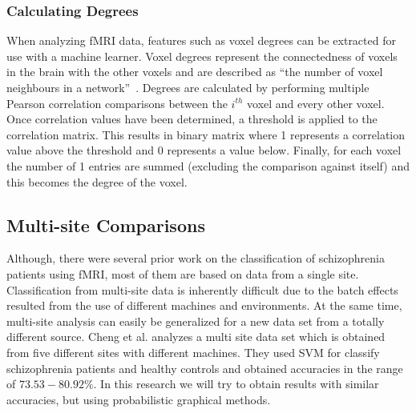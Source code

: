 \documentclass{article} %
\begin{document}
\subsubsection{Calculating Degrees}
When analyzing fMRI data, features such as voxel degrees can be extracted for
use with a machine learner. Voxel degrees represent the connectedness of
voxels in the brain with the other voxels and are described as ``the number
of voxel neighbours in a network''~\cite{Rish_2013}. Degrees are calculated 
by performing
multiple Pearson correlation comparisons between the $i^{th}$ voxel and every
other voxel. Once correlation values have been determined, a threshold is
applied to the correlation matrix. This results in binary matrix where 1 
represents a correlation value above the threshold and 0 represents a value 
below. Finally, for each voxel the number of 1 entries are summed (excluding 
the comparison against itself) and this becomes the degree of the voxel.


\subsection{Multi-site Comparisons}
Although, there were several prior work on the classification of schizophrenia 
patients using fMRI, most of them are based on data from a single site. 
Classification from multi-site data is inherently difficult due to the batch 
effects resulted from the use of different machines and environments. At the 
same time, multi-site analysis can easily be generalized for a new data set 
from a totally different source. Cheng et al. \cite{Cheng2015} analyzes a 
multi site data set which is obtained from five different sites with different 
machines. They used SVM for classify schizophrenia patients and healthy 
controls and obtained accuracies in the range of $73.53- 80.92\%$. In this 
research we will try to obtain results with similar accuracies, but using 
probabilistic graphical methods.
\end{document}
